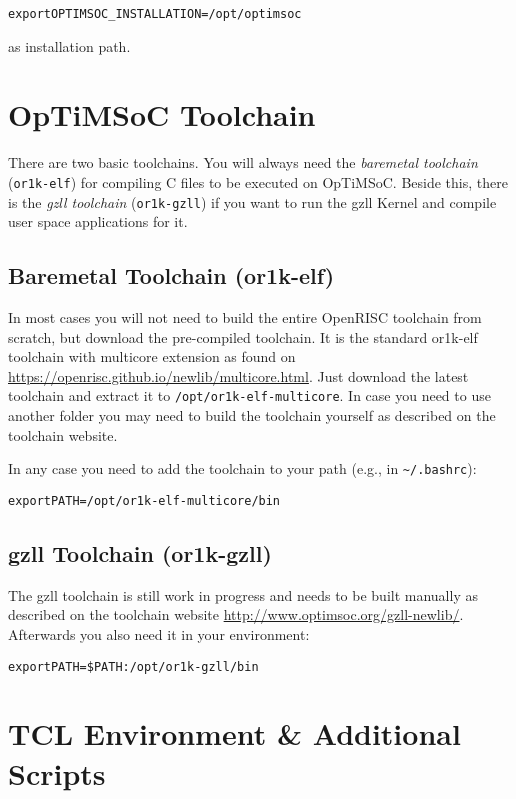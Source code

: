 \begin{alltt}
export OPTIMSOC_INSTALLATION=/opt/optimsoc
\end{alltt}

as installation path.

\section{OpTiMSoC Toolchain}

There are two basic toolchains. You will always need the
\emph{baremetal toolchain} (\verb|or1k-elf|) for compiling C files to
be executed on OpTiMSoC. Beside this, there is the \emph{gzll
  toolchain} (\verb|or1k-gzll|) if you want to run the gzll Kernel and
compile user space applications for it.

\subsection{Baremetal Toolchain (or1k-elf)}

In most cases you will not need to build the entire OpenRISC toolchain
from scratch, but download the pre-compiled toolchain. It is the
standard or1k-elf toolchain with multicore extension as found on
\url{https://openrisc.github.io/newlib/multicore.html}. Just download
the latest toolchain and extract it to
\verb|/opt/or1k-elf-multicore|. In case you need to use another folder
you may need to build the toolchain yourself as described on the
toolchain website.

In any case you need to add the toolchain to your path (e.g., in
\verb|~/.bashrc|):

\begin{alltt}
export PATH=/opt/or1k-elf-multicore/bin
\end{alltt}

\subsection{gzll Toolchain (or1k-gzll)}

The gzll toolchain is still work in progress and needs to be built
manually as described on the toolchain website
\url{http://www.optimsoc.org/gzll-newlib/}. Afterwards you also need
it in your environment:

\begin{alltt}
export PATH=\$PATH:/opt/or1k-gzll/bin
\end{alltt}

\section{TCL Environment \& Additional Scripts}

